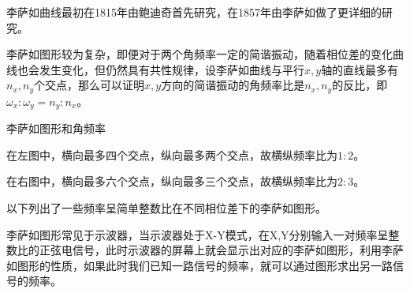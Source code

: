 李萨如曲线最初在1815年由鲍迪奇首先研究，在1857年由李萨如做了更详细的研究。

李萨如图形较为复杂，即便对于两个角频率一定的简谐振动，随着相位差的变化曲线也会发生变化，但仍然具有共性规律，设李萨如曲线与平行$x,y$轴的直线最多有$n_x,n_y$个交点，那么可以证明$x,y$方向的简谐振动的角频率比是$n_x,n_y$的反比，即$\omega_x:\omega_y=n_y:n_x$。
\begin{Figure}{李萨如图形和角频率}
    \qquad\qquad
\end{Figure}
在左图中，横向最多四个交点，纵向最多两个交点，故横纵频率比为$1:2$。

在右图中，横向最多六个交点，纵向最多三个交点，故横纵频率比为$2:3$。

以下列出了一些频率呈简单整数比在不同相位差下的李萨如图形。
\begin{table}[H]
    \begin{center}
    \end{center}
    \caption{李萨如图形}
    \label{表:李萨如图形}
\end{table}

李萨如图形常见于示波器，当示波器处于X-Y模式，在X,Y分别输入一对频率呈整数比的正弦电信号，此时示波器的屏幕上就会显示出对应的李萨如图形，利用李萨如图形的性质，如果此时我们已知一路信号的频率，就可以通过图形求出另一路信号的频率。